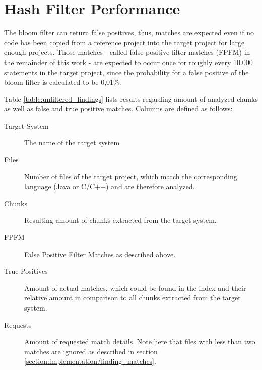 \section{Hash Filter Performance}\label{section:evaluation/hash_filter_performance}
The bloom filter can return false positives, thus, matches are expected even if no code has been copied from a reference project into the target project for large enough projects.
Those matches - called false positive filter matches (FPFM) in the remainder of this work - are expected to occur once for roughly every 10.000 statements in the target project, since the probability for a false positive of the bloom filter is calculated to be 0,01\%. 

Table \ref{table:unfiltered_findings} lists results regarding amount of analyzed chunks as well as false and true positive matches.
Columns are defined as follows:
\begin{description}
	\item[Target System] The name of the target system
	\item[Files] Number of files of the target project, which match the corresponding language (Java or C/C++) and are therefore analyzed.
	\item[Chunks] Resulting amount of chunks extracted from the target system.
	\item[FPFM] False Positive Filter Matches as described above.
	\item[True Positives] Amount of actual matches, which could be found in the index and their relative amount in comparison to all chunks extracted from the target system.
	\item[Requests] Amount of requested match details. Note here that files with less than two matches are ignored as described in section \ref{section:implementation/finding_matches}.
\end{description}

